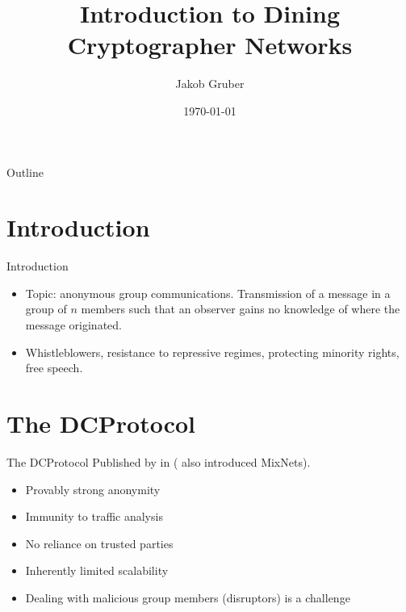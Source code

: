 \documentclass[]{beamer} %
\title{Introduction to Dining Cryptographer Networks}
\author{Jakob Gruber}
\date{\today}
\begin{document}
\maketitle

\begin{frame}{Outline}
	\begin{minipage}[t][10em][t]{\linewidth}
		\tableofcontents
	\end{minipage}
\end{frame}

\section{Introduction}

\begin{frame}{Introduction}
\begin{itemize}
\item Topic: anonymous group communications. Transmission of a message in a group
      of $n$ members such that an observer gains no knowledge of where the message originated.
\item Whistleblowers, resistance to repressive regimes, protecting minority rights, free speech.      
\end{itemize}

\end{frame}

\section{The \acl{DCProtocol}}

\begin{frame}{The \acl{DCProtocol}} %
Published by \citeauthor{journals/joc/Chaum88} in \citeyear{journals/joc/Chaum88}
\cite{journals/joc/Chaum88} (\citeauthor{journals/joc/Chaum88} also introduced \aclp{MixNet}).

\begin{itemize}
\item Provably strong anonymity
\item Immunity to traffic analysis
\item No reliance on trusted parties
\item Inherently limited scalability
\item Dealing with malicious group members (disruptors) is a challenge
\end{itemize}

\end{frame}
\end{document}
